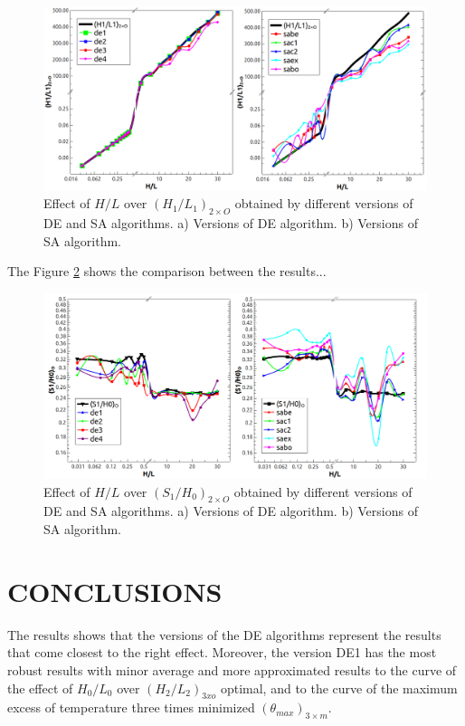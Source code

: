\documentclass[12pt,fleqn]{article}
\begin{document}
\begin{figure}[H]
\centering
\includegraphics[width=1\linewidth]{imgs/5dof/de_sa_hl_h1l1.png}
\caption{ {\small Effect of $H/L$ over ${(H_{1}/L_{1})_{2\times O}}$ obtained by different versions of DE and SA algorithms.  a) Versions of DE algorithm. b) Versions of SA algorithm.}}
\label{figure07}
\end{figure}


The Figure \ref{figure08} shows the comparison between the results...


\begin{figure}[H]
\centering
\includegraphics[width=1\linewidth]{imgs/5dof/de_sa_hl_s1h0.png}
\caption{ {\small Effect of $H/L$ over ${(S_{1}/H_{0})_{2\times O}}$ obtained by different versions of DE and SA algorithms.  a) Versions of DE algorithm. b) Versions of SA algorithm.}}
\label{figure08}
\end{figure}

\section{CONCLUSIONS}

The results shows that the versions of the DE algorithms represent the results that come closest to the right effect. Moreover, the version DE1 has the most robust results with minor average and more approximated results to the curve of the effect of $H_{0}/L_{0}$ over $(H_{2}/L_{2})_{3xo}$ optimal, and to the curve of the maximum excess of temperature three times minimized $({\theta}_{max})_{3\times m}$.
\end{document}
